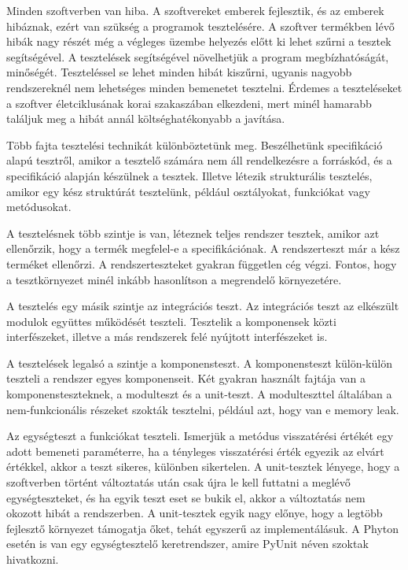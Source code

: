 
Minden szoftverben van hiba. A szoftvereket emberek fejlesztik, és az emberek hibáznak, ezért van szükség a programok tesztelésére. A szoftver termékben lévő hibák nagy részét még a végleges üzembe helyezés előtt ki lehet szűrni a tesztek segítségével. A tesztelések segítségével növelhetjük a program megbízhatóságát, minőségét. Teszteléssel se lehet minden hibát kiszűrni, ugyanis nagyobb rendszereknél nem lehetséges minden bemenetet tesztelni. Érdemes a teszteléseket a szoftver életciklusának korai szakaszában elkezdeni, mert minél hamarabb találjuk meg a hibát annál költséghatékonyabb a javítása.

Több fajta tesztelési technikát különböztetünk meg. Beszélhetünk specifikáció alapú tesztről, amikor a tesztelő számára nem áll rendelkezésre a forráskód, és a specifikáció alapján készülnek a tesztek. Illetve létezik strukturális tesztelés, amikor egy kész struktúrát tesztelünk, például osztályokat, funkciókat vagy metódusokat.


A tesztelésnek több szintje is van, léteznek teljes rendszer tesztek,	 amikor azt ellenőrzik, hogy a termék megfelel-e a specifikációnak. A rendszerteszt már a kész terméket ellenőrzi. A rendszerteszteket gyakran független cég végzi. Fontos, hogy a tesztkörnyezet minél inkább hasonlítson a megrendelő környezetére.

A tesztelés egy másik szintje az integrációs teszt. Az integrációs teszt az elkészült modulok együttes működését teszteli. Tesztelik a komponensek közti interfészeket, illetve a más rendszerek felé nyújtott interfészeket is.

A tesztelések legalsó a szintje a komponensteszt. A komponensteszt külön-külön teszteli a rendszer egyes komponenseit. Két gyakran használt fajtája van a komponensteszteknek, a modulteszt és a unit-teszt. A modulteszttel általában a nem-funkcionális részeket szokták tesztelni, például azt, hogy van e memory leak.


Az egységteszt a funkciókat teszteli. Ismerjük a metódus visszatérési értékét egy adott bemeneti paraméterre, ha a tényleges visszatérési érték egyezik az elvárt értékkel, akkor a teszt sikeres, különben sikertelen. A unit-tesztek lényege, hogy a szoftverben történt változtatás után csak újra le kell futtatni a meglévő egységteszteket, és ha egyik teszt eset se bukik el, akkor a változtatás nem okozott hibát a rendszerben.
A unit-tesztek egyik nagy előnye, hogy a legtöbb fejlesztő környezet támogatja őket, tehát egyszerű az implementálásuk. A Phyton esetén is van egy egységtesztelő keretrendszer, amire PyUnit néven szoktak hivatkozni.

